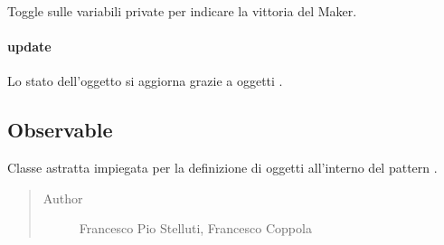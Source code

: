 \documentclass[letterpaper,10pt,italian,openany,oneside]{sphinxmanual}
\begin{document}
\begin{fulllineitems}
\label{\detokenize{source/it/unicam/cs/pa/mastermind/gamecore/MatchState:it.unicam.cs.pa.mastermind.gamecore.MatchState.toggleMakerWin()}}
Toggle sulle variabili private per indicare la vittoria del Maker.

\end{fulllineitems}



\paragraph{update}
\label{\detokenize{source/it/unicam/cs/pa/mastermind/gamecore/MatchState:update}}

\begin{fulllineitems}
\label{\detokenize{source/it/unicam/cs/pa/mastermind/gamecore/MatchState:it.unicam.cs.pa.mastermind.gamecore.MatchState.update(Observable)}}
Lo stato dell’oggetto si aggiorna grazie a oggetti .

\end{fulllineitems}



\subsection{Observable}
\label{\detokenize{source/it/unicam/cs/pa/mastermind/gamecore/Observable:observable}}\label{\detokenize{source/it/unicam/cs/pa/mastermind/gamecore/Observable::doc}}

\begin{fulllineitems}
\label{\detokenize{source/it/unicam/cs/pa/mastermind/gamecore/Observable:it.unicam.cs.pa.mastermind.gamecore.Observable}}
Classe astratta impiegata per la definizione di oggetti  all’interno del pattern .
\begin{quote}\begin{description}
\item[{Author}] \leavevmode
Francesco Pio Stelluti, Francesco Coppola

\end{description}\end{quote}

\end{fulllineitems}
\end{document}
